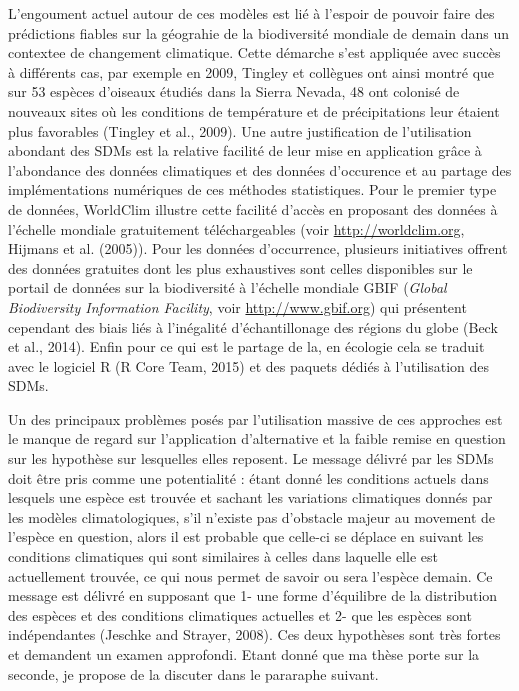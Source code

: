 L'engoument actuel autour de ces modèles est lié à l'espoir de pouvoir
faire des prédictions fiables sur la géograhie de la biodiversité
mondiale de demain dans un contextee de changement climatique. Cette
démarche s'est appliquée avec succès à différents cas, par exemple en
2009, Tingley et collègues ont ainsi montré que sur 53 espèces d'oiseaux
étudiés dans la Sierra Nevada, 48 ont colonisé de nouveaux sites où les
conditions de température et de précipitations leur étaient plus
favorables (Tingley et al., 2009). Une autre justification de
l'utilisation abondant des SDMs est la relative facilité de leur mise en
application grâce à l'abondance des données climatiques et des données
d'occurence et au partage des implémentations numériques de ces méthodes
statistiques. Pour le premier type de données, WorldClim illustre cette
facilité d'accès en proposant des données à l'échelle mondiale
gratuitement téléchargeables (voir \url{http://worldclim.org}, Hijmans
et al. (2005)). Pour les données d'occurrence, plusieurs initiatives
offrent des données gratuites dont les plus exhaustives sont celles
disponibles sur le portail de données sur la biodiversité à l'échelle
mondiale GBIF (\emph{Global Biodiversity Information Facility}, voir
\url{http://www.gbif.org}) qui présentent cependant des biais liés à
l'inégalité d'échantillonage des régions du globe (Beck et al., 2014).
Enfin pour ce qui est le partage de la, en écologie cela se traduit avec
le logiciel R (R Core Team, 2015) et des paquets dédiés à l'utilisation
des SDMs.

Un des principaux problèmes posés par l'utilisation massive de ces
approches est le manque de regard sur l'application d'alternative et la
faible remise en question sur les hypothèse sur lesquelles elles
reposent. Le message délivré par les SDMs doit être pris comme une
potentialité : étant donné les conditions actuels dans lesquels une
espèce est trouvée et sachant les variations climatiques donnés par les
modèles climatologiques, s'il n'existe pas d'obstacle majeur au movement
de l'espèce en question, alors il est probable que celle-ci se déplace
en suivant les conditions climatiques qui sont similaires à celles dans
laquelle elle est actuellement trouvée, ce qui nous permet de savoir ou
sera l'espèce demain. Ce message est délivré en supposant que 1- une
forme d'équilibre de la distribution des espèces et des conditions
climatiques actuelles et 2- que les espèces sont indépendantes (Jeschke
and Strayer, 2008). Ces deux hypothèses sont très fortes et demandent un
examen approfondi. Etant donné que ma thèse porte sur la seconde, je
propose de la discuter dans le pararaphe suivant.

